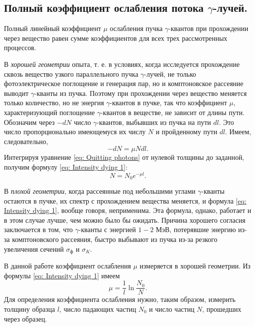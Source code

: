 \documentclass[a4paper,12pt]{article}
\begin{document}
\subsection{Полный коэффициент ослабления потока $\gamma$-лучей.}
Полный линейный коэффициент $\mu$ ослабления пучка $\gamma$-квантов при прохождении через вещество равен сумме коэффициентов для всех трех рассмотренных процессов.

В \textit{хорошей геометрии} опыта, т. е. в условиях, когда исследуется прохождение сквозь вещество узкого параллельного пучка $\gamma$-лучей, не только фотоэлектрическое поглощение и генерация пар, но и комптоновское рассеяние выводит $\gamma$-кванты из пучка. Поэтому при прохождении через вещество меняется только количество, но не энергия $\gamma$-квантов в пучке, так что коэффициент $\mu$, характеризующий поглощение $\gamma$-квантов в веществе, не зависит от длины пути. Обозначим через $-dN$ число $\gamma$-квантов, выбывших из пучка на пути $dl$. Это число пропорционально имеющемуся их числу $N$ и пройденному пути $dl$. Имеем, следовательно,
\begin{equation}\label{eq: Quitting photons}
    -dN = \mu Ndl.
\end{equation}
Интегрируя уравнение \ref{eq: Quitting photons} от нулевой толщины до заданной, получим формулу \ref{eq: Intensity dying 1}:
\begin{equation}\label{eq: Number of photons dying}
    N = N_0e^{-\mu l}.
\end{equation}

В \textit{плохой геометрии}, когда рассеянные под небольшими углами $\gamma$-кванты остаются в пучке, их спектр с прохождением вещества меняется, и формула \ref{eq: Intensity dying 1}, вообще говоря, неприменима. Эта формула, однако, работает и в этом случае лучше, чем можно было бы ожидать.
Причина хорошего согласия заключается в том, что $\gamma$-кванты с энергией $1-2$ МэВ, потерявшие энергию из-за комптоновского рассеяния, быстро выбывают из пучка из-за резкого увеличения сечений $\sigma_\text{ф}$ и $\sigma_K$.

В данной работе коэффициент ослабления $\mu$ измеряется в хорошей геометрии. Из формулы \ref{eq: Intensity dying 1} имеем
\begin{equation}\label{eq: Attenuation coefficient}
    \mu = \frac{1}{l}\ln\frac{N_0}{N}.
\end{equation}
Для определения коэффициента ослабления нужно, таким образом, измерить толщину образца $l$, число падающих частиц $N_0$ и число частиц $N$, прошедших через образец.
\end{document}
